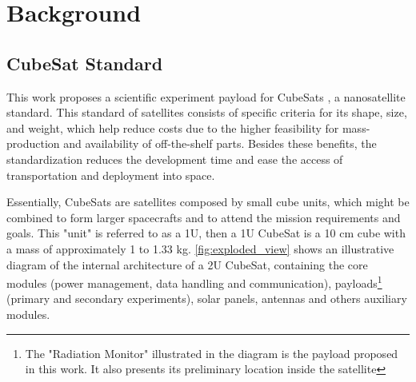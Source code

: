 %
%
%
%
%

%
%
%
%
%

\newpage

\section{Background} \label{sec:background}


\subsection{CubeSat Standard}

This work proposes a scientific experiment payload for CubeSats \cite{cubesat_101}, a nanosatellite \cite{small_spacecraft_state_of_art} standard. This standard of satellites consists of specific criteria for its shape, size, and weight, which help reduce costs due to the higher feasibility for mass-production and availability of off-the-shelf parts. Besides these benefits, the standardization reduces the development time and ease the access of transportation and deployment into space.

Essentially, CubeSats are satellites composed by small cube units, which might be combined to form larger spacecrafts and to attend the mission requirements and goals. This "unit" is referred to as a 1U, then a 1U CubeSat is a 10 cm cube with a mass of approximately 1 to 1.33 kg. \autoref{fig:exploded_view} shows an illustrative diagram of the internal architecture of a 2U CubeSat, containing the core modules (power management, data handling and communication), payloads\footnote{The "Radiation Monitor" illustrated in the diagram is the payload proposed in this work. It also presents its preliminary location inside the satellite} (primary and secondary experiments), solar panels, antennas and others auxiliary modules.


